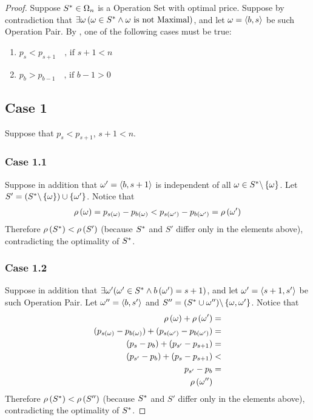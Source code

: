 \begin{proof}
    Suppose $S^{*} \in \Omega_{n}$ is a Operation Set with optimal price. Suppose by contradiction that $\exists \omega \left( \omega \in S^{*} \land \omega \mbox{ is not Maximal} \right)$, and let $\omega = \left\langle b, s \right\rangle$ be such Operation Pair. By , one of the following cases must be true:
    \begin{enumerate}
        \item $p_s < p_{s+1} \quad \mbox{, if } s+1 < n$
        \item $p_b > p_{b-1} \quad \mbox{, if } b-1 > 0$
    \end{enumerate}

    \subsection*{Case 1} \label{proof:opt-price-I-case-1}
    Suppose that $p_s < p_{s+1}$, $s+1 < n$.
    
    \subsubsection*{Case 1.1}
    Suppose in addition that $\omega' = \left\langle b, s+1 \right\rangle$ is independent of all $\omega \in S^{*} \backslash \left\{ \omega \right\}$. Let $S' = (S^{*} \backslash \left\{ \omega \right\}) \cup \left\{ \omega' \right\}$. Notice that 
    \begin{align}
        \rho\left( \omega \right) = p_{s\left( \omega \right)} - p_{b\left( \omega \right)} < p_{s\left( \omega' \right)} - p_{b\left( \omega' \right)} = \rho\left( \omega' \right) 
    \end{align}
    Therefore $\rho\left( S^{*} \right) < \rho\left( S' \right)$ (because $S^{*}$ and $S'$ differ only in the elements above), contradicting the optimality of $S^{*}$.
    
    \subsubsection*{Case 1.2}
    Suppose in addition that $\exists \omega'(\omega' \in S^{*} \land b\left( \omega' \right) = s + 1)$, and let $\omega' = \left\langle s+1, s' \right\rangle$ be such Operation Pair. Let $\omega'' = \left\langle b, s' \right\rangle$ and $S'' = (S^{*} \cup {\ensuremath{\omega}''}) \backslash \left\{ \omega, \omega' \right\}$. Notice that
    \begin{align}
        \rho\left( \omega \right) + \rho\left( \omega' \right) & = \\\nonumber
        (p_{s\left( \omega \right)} - p_{b\left( \omega \right)}) + (p_{s\left( \omega' \right)} - p_{b\left( \omega' \right)}) & = \\\nonumber
        (p_{s} - p_{b}) + (p_{s'} - p_{s+1}) & = \\\nonumber
        (p_{s'} - p_{b}) + (p_{s} - p_{s+1}) & < \\\nonumber
        p_{s'} - p_{b} & = \\\nonumber
        \rho\left( \omega'' \right)
    \end{align}
    Therefore $\rho\left( S^{*} \right) < \rho\left( S'' \right)$ (because $S^{*}$ and $S'$ differ only in the elements above), contradicting the optimality of $S^{*}$.


\end{proof}
